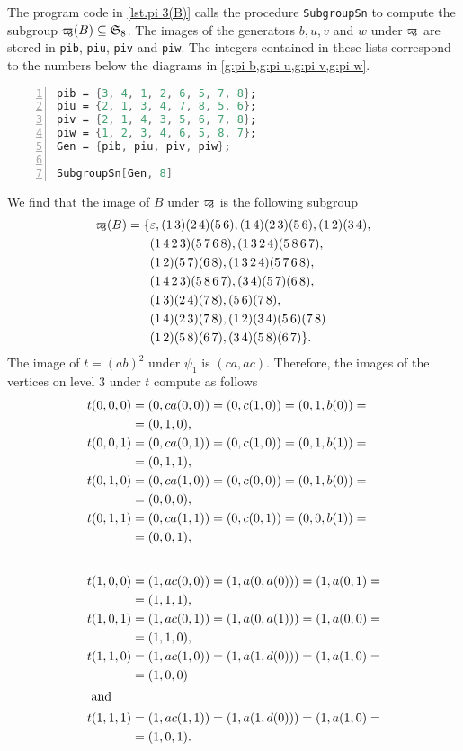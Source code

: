 The program code in \cref{lst.pi 3(B)} calls the procedure \verb+SubgroupSn+ to compute the subgroup $\varpi\hspace{-0.4em}_3(B)\subseteq\mathfrak{S}_8$. The images of the generators $b,u,v$ and $w$ under $\varpi\hspace{-0.4em}_3$ are stored in \verb+pib+, \verb+piu+, \verb+piv+ and \verb+piw+. The integers contained in these lists correspond to the numbers below the diagrams in \cref{g:pi b,g:pi u,g:pi v,g:pi w}.
\begin{lstlisting}[float, caption=Computing $\varpikern_3(B)\subseteq\mathfrak{S}_8$,
                   label=lst.pi 3(B),
                   language=Mathematica, 
                   numbers=left,
                   numberstyle=\tiny,
                   stepnumber=2,
                   numbersep=5pt]
pib = {3, 4, 1, 2, 6, 5, 7, 8};
piu = {2, 1, 3, 4, 7, 8, 5, 6};
piv = {2, 1, 4, 3, 5, 6, 7, 8};
piw = {1, 2, 3, 4, 6, 5, 8, 7};
Gen = {pib, piu, piv, piw};

SubgroupSn[Gen, 8]
\end{lstlisting}
We find that the image of $B$ under $\varpi\hspace{-0.4em}_3$ is the following subgroup
\begin{align*}
\varpi\hspace{-0.4em}_3(B)=\lbrace	&\varepsilon,(1\, 3)(2\, 4)(5\, 6),   (1\, 4)(2\, 3)(5\, 6), (1\, 2)(3\, 4),\\
                  & (1\, 4\, 2\, 3)(5\, 7\, 6\, 8),	(1\, 3\, 2\, 4)(5\, 8\, 6\, 7),\\   & (1\, 2)(5\, 7)(6\, 8), (1\, 3\, 2\, 4)(5\, 7\, 6\, 8),\\
                  & (1\, 4\, 2\, 3)(5\, 8\, 6\, 7),   (3\, 4)(5\, 7)(6\, 8),\\
                  & (1\, 3)(2\, 4)(7\, 8),   (5\, 6)(7\, 8),\\
                  & (1\, 4)(2\, 3)(7\, 8), (1\, 2)(3\, 4)(5\, 6)(7\, 8)\\
                  & (1\, 2)(5\, 8)(6\, 7), (3\, 4)(5\, 8)(6\, 7)\rbrace.
\end{align*}
The image of $t=(ab)^2$ under $\psi_1$ is $(ca,ac)$. Therefore, the images of the vertices on level 3 under $t$ compute as follows
\begin{align*}
t(0,0,0)&=(0,ca(0,0))=(0,c(1,0))=(0,1,b(0))=\\
        &=(0,1,0),\\
t(0,0,1)&=(0,ca(0,1))=(0,c(1,0))=(0,1,b(1))=\\
        &=(0,1,1),\\
t(0,1,0)&=(0,ca(1,0))=(0,c(0,0))=(0,1,b(0))=\\
        &=(0,0,0),\\
t(0,1,1)&=(0,ca(1,1))=(0,c(0,1))=(0,0,b(1))=\\
        &=(0,0,1),\\[2em]
t(1,0,0)&=(1,ac(0,0))=(1,a(0,a(0)))=(1,a(0,1)=\\
        &=(1,1,1),\\
t(1,0,1)&=(1,ac(0,1))=(1,a(0,a(1)))=(1,a(0,0)=\\
        &=(1,1,0),\\
t(1,1,0)&=(1,ac(1,0))=(1,a(1,d(0)))=(1,a(1,0)=\\
        &=(1,0,0)\\
\intertext{ and}
t(1,1,1)&=(1,ac(1,1))=(1,a(1,d(0)))=(1,a(1,0)=\\
        &=(1,0,1).
\end{align*}
